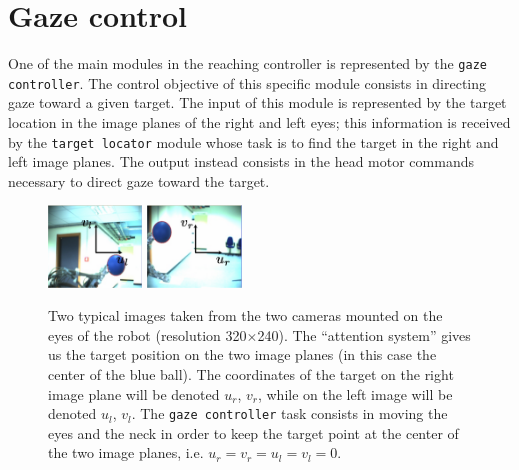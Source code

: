 \section{Gaze control}
\label{Sec:gazecontrol}

One of the main modules in the reaching controller is represented 
by the {\tt gaze controller}. The control objective of this specific 
module consists in directing gaze toward a given target. The input of 
this module is represented by the target location in the image planes of 
the right and left eyes; this information is received by the {\tt target 
locator} module whose task is to find the target in the right and left 
image planes. The output instead consists in the head motor commands 
necessary to direct gaze toward the target. 

\begin{figure}[tbp]
\centering
\includegraphics[width=25mm]{Figure/LeftImage.eps} \hspace{1cm}
\includegraphics[width=25mm]{Figure/RightImage.eps}
\caption{Two typical images taken from the two cameras mounted on the 
eyes of the robot (resolution 320$\times$240). The ``attention system'' gives us the target position 
on the two image planes (in this case the center of the blue ball). 
The coordinates of the target on the right image plane will be denoted 
$u_r$, $v_r$, while on the left image will be denoted $u_l$, $v_l$. 
The {\tt gaze controller} task consists in moving the eyes and the 
neck in order to keep the target point at the center of the two image 
planes, i.e. $u_r = v_r = u_l = v_l = 0$.}
\label{Fig:ImagePlane}
\end{figure}
 
